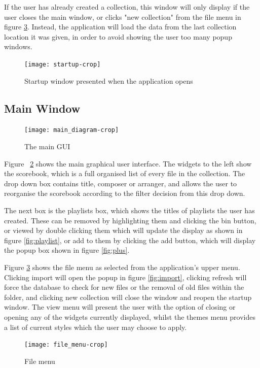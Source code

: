 \begin{appendices}
If the user has already created a collection, this window will only display if the user closes the main window, or clicks "new collection" from the file menu in figure \ref{fig:menu}. Instead, the application will load the data from the last collection location it was given, in order to avoid showing the user too many popup windows.

\begin{figure}[H]
\centering
\texttt{[image: startup-crop]}
\caption{Startup window presented when the application opens}
\label{fig:startup}	
\end{figure}

\subsection{Main Window}
\begin{figure}[H]
	\centering
	\texttt{[image: main\_diagram-crop]}
	\caption{The main GUI}
	\label{fig:m}	
\end{figure}

Figure ~\ref{fig:m} shows the main graphical user interface. The widgets to the left show the scorebook, which is a full organised list of every file in the collection. The drop down box contains title, composer or arranger, and allows the user to reorganise the scorebook according to the filter decision from this drop down.

The next box is the playlists box, which shows the titles of playlists the user has created. These can be removed by highlighting them and clicking the bin button, or viewed by double clicking them which will update the display as shown in figure \ref{fig:playlist}, or add to them by clicking the add button, which will display the popup box shown in figure \ref{fig:plus}.

Figure \ref{fig:menu} shows the file menu as selected from the application's upper menu. Clicking import will open the popup in figure \ref{fig:import}, clicking refresh will force the database to check for new files or the removal of old files within the folder, and clicking new collection will close the window and reopen the startup window. The view menu will present the user with the option of closing or opening any of the widgets currently displayed, whilst the themes menu provides a list of current styles which the user may choose to apply.

\begin{figure}[H]
\centering
\texttt{[image: file\_menu-crop]}
\caption{File menu}
\label{fig:menu}	
\end{figure}


\end{appendices}
